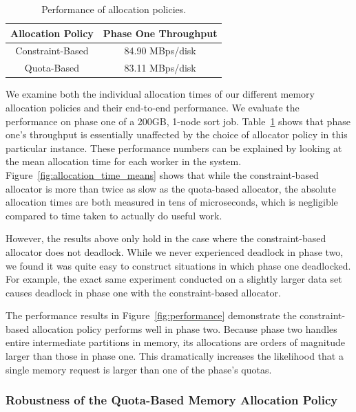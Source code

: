 \begin{table}
  \centering
  \caption{\label{table:allocator_end_to_end_performance} Performance of
    allocation policies.}
  \begin{tabular}{|c|c|}
    \hline
    \textbf{Allocation Policy} & \textbf{Phase One Throughput} \\
    \hline
    Constraint-Based & 84.90 MBps/disk \\
    Quota-Based & 83.11 MBps/disk \\
    \hline
  \end{tabular}
\end{table}

We examine both the individual allocation times of our different memory
allocation policies and their end-to-end performance.  We evaluate the
performance on phase one of a 200GB, 1-node sort
job. Table~\ref{table:allocator_end_to_end_performance} shows that phase one's
throughput is essentially unaffected by the choice of allocator policy in this
particular instance. These performance numbers can be explained by looking at
the mean allocation time for each worker in the
system. Figure~\ref{fig:allocation_time_means} shows that while the
constraint-based allocator is more than twice as slow as the quota-based
allocator, the absolute allocation times are both measured in tens of
microseconds, which is negligible compared to time taken to actually do useful
work.

However, the results above only hold in the case where the constraint-based
allocator does not deadlock. While we never experienced deadlock in phase two,
we found it was quite easy to construct situations in which phase one
deadlocked. For example, the exact same experiment conducted on a slightly
larger data set causes deadlock in phase one with the constraint-based
allocator.

The performance results in Figure~\ref{fig:performance} demonstrate the
constraint-based allocation policy performs well in phase two.  Because phase
two handles entire intermediate partitions in memory, its allocations are
orders of magnitude larger than those in phase one. This dramatically increases
the likelihood that a single memory request is larger than one of the phase's
quotas.

\subsubsection{Robustness of the Quota-Based Memory Allocation Policy}

